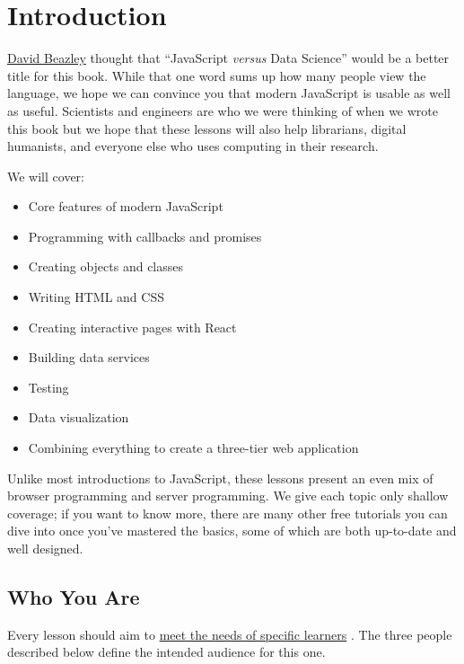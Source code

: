 \chapter{Introduction}\label{s:intro}

\href{https://www.dabeaz.com/}{David Beazley} thought that ``JavaScript \emph{versus} Data Science''
would be a better title for this book.
While that one word sums up how many people view the language,
we hope we can convince you that modern JavaScript is usable as well as useful.
Scientists and engineers are who we were thinking of when we wrote this book
but we hope that these lessons will also help librarians,
digital humanists,
and everyone else who uses computing in their research.

We will cover:

\begin{itemize}
\item
  Core features of modern JavaScript
\item
  Programming with callbacks and promises
\item
  Creating objects and classes
\item
  Writing HTML and CSS
\item
  Creating interactive pages with React
\item
  Building data services
\item
  Testing
\item
  Data visualization
\item
  Combining everything to create a three-tier web application
\end{itemize}

Unlike most introductions to JavaScript,
these lessons present an even mix of browser programming and server programming.
We give each topic only shallow coverage;
if you want to know more,
there are many other free tutorials you can dive into once you've mastered the basics,
some of which are both up-to-date and well designed.

\section{Who You Are}\label{s:intro-personas}

Every lesson should aim to \href{http://teachtogether.tech/en/process/}{meet the needs of specific learners} \cite{Wils2019}.
The three people described below define the intended audience for this one.

